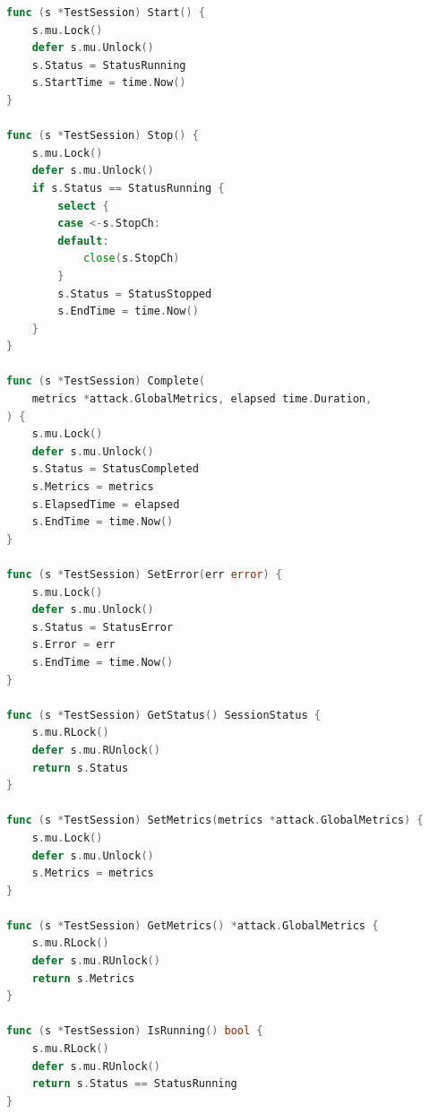 \begin{lstlisting}[language=Go,caption={Исходный код \texttt{cmd/server/session.go} --- конечный автомат тестовой сессии},label={lst:app-session}]
func (s *TestSession) Start() {
    s.mu.Lock()
    defer s.mu.Unlock()
    s.Status = StatusRunning
    s.StartTime = time.Now()
}

func (s *TestSession) Stop() {
    s.mu.Lock()
    defer s.mu.Unlock()
    if s.Status == StatusRunning {
        select {
        case <-s.StopCh:
        default:
            close(s.StopCh)
        }
        s.Status = StatusStopped
        s.EndTime = time.Now()
    }
}

func (s *TestSession) Complete(
    metrics *attack.GlobalMetrics, elapsed time.Duration,
) {
    s.mu.Lock()
    defer s.mu.Unlock()
    s.Status = StatusCompleted
    s.Metrics = metrics
    s.ElapsedTime = elapsed
    s.EndTime = time.Now()
}

func (s *TestSession) SetError(err error) {
    s.mu.Lock()
    defer s.mu.Unlock()
    s.Status = StatusError
    s.Error = err
    s.EndTime = time.Now()
}

func (s *TestSession) GetStatus() SessionStatus {
    s.mu.RLock()
    defer s.mu.RUnlock()
    return s.Status
}

func (s *TestSession) SetMetrics(metrics *attack.GlobalMetrics) {
    s.mu.Lock()
    defer s.mu.Unlock()
    s.Metrics = metrics
}

func (s *TestSession) GetMetrics() *attack.GlobalMetrics {
    s.mu.RLock()
    defer s.mu.RUnlock()
    return s.Metrics
}

func (s *TestSession) IsRunning() bool {
    s.mu.RLock()
    defer s.mu.RUnlock()
    return s.Status == StatusRunning
}
\end{lstlisting}

